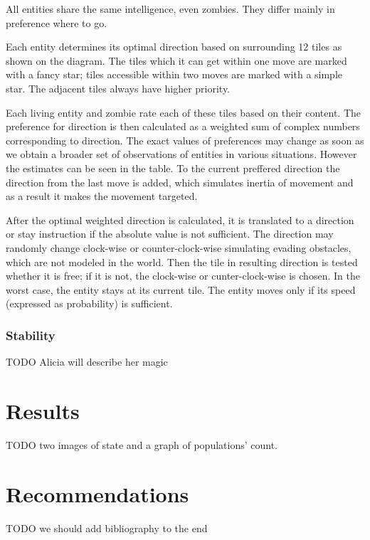 \documentclass[a4paper]{article}
\begin{document}
All entities share the same intelligence, even zombies.
They differ mainly in preference where to go.

Each entity determines its optimal direction based on surrounding 12 tiles as shown on the diagram.
The tiles which it can get within one move are marked with a fancy star; tiles accessible within two moves are marked with a simple star.
The adjacent tiles always have higher priority.

Each living entity and zombie rate each of these tiles based on their content.
The preference for direction is then calculated as a weighted sum of complex numbers corresponding to direction.
The exact values of preferences may change as soon as we obtain a broader set of observations of entities in various situations.
However the estimates can be seen in the table.
To the current preffered direction the direction from the last move is added, which simulates inertia of movement and as a result it makes the movement targeted.

After the optimal weighted direction is calculated, it is translated to a direction or stay instruction if the absolute value is not sufficient.
The direction may randomly change clock-wise or counter-clock-wise simulating evading obstacles, which are not modeled in the world.
Then the tile in resulting direction is tested whether it is free; if it is not, the clock-wise or cunter-clock-wise is chosen.
In the worst case, the entity stays at its current tile.
The entity moves only if its speed (expressed as probability) is sufficient.

\subsubsection{Stability}

TODO Alicia will describe her magic

\section{Results}

TODO two images of state and a graph of populations' count.

\section{Recommendations}

TODO we should add bibliography to the end
\end{document}
